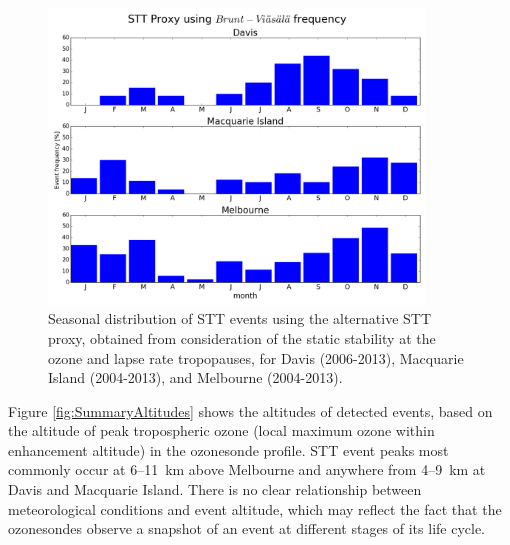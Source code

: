\documentclass[acp, manuscript]{copernicus} %
\begin{document}
  \begin{figure}[t]
    \includegraphics[width=10cm]{figures/AndrewProxySTTV2.png}
    \caption{Seasonal distribution of STT events using the alternative STT proxy, obtained from consideration of the static stability at the ozone and lapse rate tropopauses, for Davis (2006-2013), Macquarie Island (2004-2013), and Melbourne (2004-2013).}
    \label{fig:AndrewProxySTT}
  \end{figure}
  
  Figure \ref{fig:SummaryAltitudes} shows the altitudes of detected events, based on the altitude of peak tropospheric ozone (local maximum ozone within enhancement altitude) in the ozonesonde profile.
  STT event peaks most commonly occur at 6--11~km above Melbourne and anywhere from 4--9~km at Davis and Macquarie Island.
  There is no clear relationship between meteorological conditions and event altitude, which may reflect the fact that the ozonesondes observe a snapshot of an event at different stages of its life cycle.
  
\end{document}
